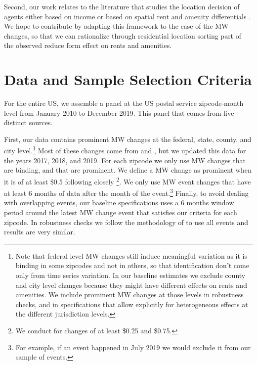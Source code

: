 \documentclass{article}
\begin{document}
Second, our work relates to the literature that studies the location decision of agents either based on income \parencite{roback1982wages, kennan2011effect, desmet2013urban, perez2018city} or based on spatial rent and amenity differentials \parencite{diamond2016determinants,almagro2019location,couture2019income, bayer2004equilibrium}. We hope to contribute by adapting this framework to the case of the MW changes, so that we can rationalize through residential location sorting part of the observed reduce form effect on rents and amenities. 


 \section{Data and Sample Selection Criteria}

For the entire US, we assemble a panel at the US postal service zipcode-month level from January 2010 to December 2019. This panel that comes from five distinct sources. 

First, our data contains prominent MW changes at the federal, state, county, and city level.\footnote{Note that federal level MW changes still induce meaningful variation as it is binding in some zipcodes and not in others, so that identification don't come only from time series variation. In our baseline estimates we exclude county and city level changes because they might have different effects on rents and amenities. We include prominent MW changes at those levels in robustness checks, and in specifications that allow explicitly for heterogeneous effects at the different jurisdiction levels.} Most of these changes come from \textcite{vaghul2016historical} and \textcite{cengiz2019effect}, but we updated this data for the years 2017, 2018, and 2019. For each zipcode we only use MW changes that are binding, and that are prominent. We define a MW change as prominent when it is of at least \$0.5 following closely \textcite{cengiz2019effect}\footnote{We conduct for changes of at least \$0.25 and \$0.75.}. We only use MW event changes that have at least 6 months of data after the month of the event.\footnote{For example, if an event happened in July 2019 we would exclude it from our sample of events.} Finally, to avoid dealing with overlapping events, our baseline specifications uses a 6 months window period around the latest MW change event that satisfies our criteria for each zipcode. In robustness checks we follow the methodology of \textcite{cengiz2019effect} to use all events and results are very similar.
\end{document}
